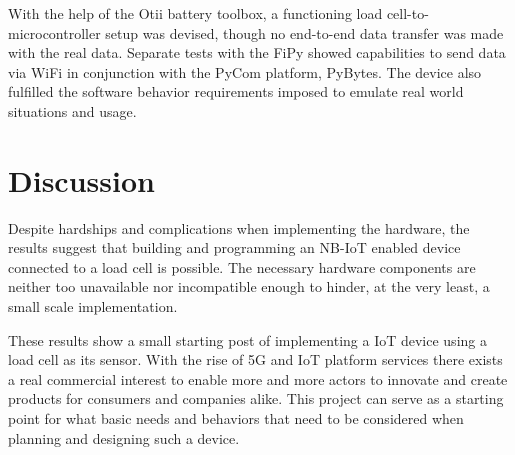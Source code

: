 \iffalse
\begin{itemize}
	\item Don’t make the reader do all the work
	\item Have a hypothesis, test them, state result clearly
	\item Two lists are not a comparison
	\item Be the first to criticize your own work
\end{itemize}
\fi

With the help of the Otii battery toolbox, a functioning load cell-to-microcontroller setup was devised, though no end-to-end data transfer was made with the real data. Separate tests with the FiPy showed capabilities to send data via WiFi in conjunction with the PyCom platform, PyBytes. %
The device also fulfilled the software behavior requirements imposed to emulate real world situations and usage.

\section{Discussion}
Despite hardships and complications when implementing the hardware, the results suggest that building and programming an NB-IoT enabled device connected to a load cell is possible. The necessary hardware components are neither too unavailable nor incompatible enough to hinder, at the very least, a small scale implementation. 

These results show a small starting post of implementing a IoT device using a load cell as its sensor. With the rise of 5G and IoT platform services there exists a real commercial interest to enable more and more actors to innovate and create products for consumers and companies alike. This project can serve as a starting point for what basic needs and behaviors that need to be considered when planning and designing such a device.	


